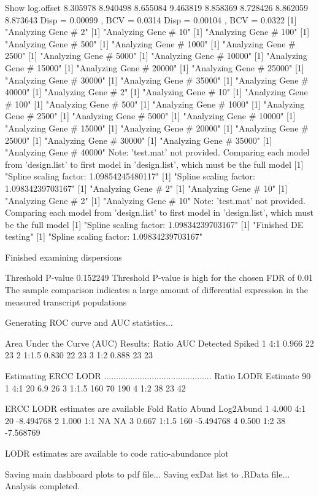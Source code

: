 \documentclass{article}
\begin{document}
\begin{Schunk}
\begin{Soutput}
Show log.offset
8.305978 8.940498 8.655084 9.463819 8.858369 8.728426 8.862059 8.873643 
Disp = 0.00099 , BCV = 0.0314 
Disp = 0.00104 , BCV = 0.0322 
[1] "Analyzing Gene # 2"
[1] "Analyzing Gene # 10"
[1] "Analyzing Gene # 100"
[1] "Analyzing Gene # 500"
[1] "Analyzing Gene # 1000"
[1] "Analyzing Gene # 2500"
[1] "Analyzing Gene # 5000"
[1] "Analyzing Gene # 10000"
[1] "Analyzing Gene # 15000"
[1] "Analyzing Gene # 20000"
[1] "Analyzing Gene # 25000"
[1] "Analyzing Gene # 30000"
[1] "Analyzing Gene # 35000"
[1] "Analyzing Gene # 40000"
[1] "Analyzing Gene # 2"
[1] "Analyzing Gene # 10"
[1] "Analyzing Gene # 100"
[1] "Analyzing Gene # 500"
[1] "Analyzing Gene # 1000"
[1] "Analyzing Gene # 2500"
[1] "Analyzing Gene # 5000"
[1] "Analyzing Gene # 10000"
[1] "Analyzing Gene # 15000"
[1] "Analyzing Gene # 20000"
[1] "Analyzing Gene # 25000"
[1] "Analyzing Gene # 30000"
[1] "Analyzing Gene # 35000"
[1] "Analyzing Gene # 40000"
Note: 'test.mat' not provided. Comparing each model 
from 'design.list' to first model in 'design.list', which must be the full model
[1] "Spline scaling factor: 1.09854245480117"
[1] "Spline scaling factor: 1.09834239703167"
[1] "Analyzing Gene # 2"
[1] "Analyzing Gene # 10"
[1] "Analyzing Gene # 2"
[1] "Analyzing Gene # 10"
Note: 'test.mat' not provided. Comparing each model 
from 'design.list' to first model in 'design.list', which must be the full model
[1] "Spline scaling factor: 1.09834239703167"
[1] "Finished DE testing"
[1] "Spline scaling factor: 1.09834239703167"

Finished examining dispersions

Threshold P-value
0.152249 
Threshold P-value is high for the chosen FDR of  0.01
The sample comparison indicates a large amount of 
 differential expression in the measured transcript 
 populations

Generating ROC curve and AUC statistics...

Area Under the Curve (AUC) Results:
  Ratio   AUC Detected Spiked
1   4:1 0.966       22     23
2 1:1.5 0.830       22     23
3   1:2 0.888       23     23

Estimating ERCC LODR
.............................................
  Ratio LODR Estimate 90%
1   4:1            20                6.9                 26
3 1:1.5           160                 70                190
4   1:2            38                 23                 42

 ERCC LODR estimates are available
   Fold Ratio Abund Log2Abund
1 4.000   4:1    20 -8.494768
2 1.000   1:1    NA        NA
3 0.667 1:1.5   160 -5.494768
4 0.500   1:2    38 -7.568769

LODR estimates are available to code ratio-abundance plot

Saving main dashboard plots to pdf file...
Saving exDat list to .RData file...
Analysis completed.
\end{Soutput}
\end{Schunk}
\end{document}
